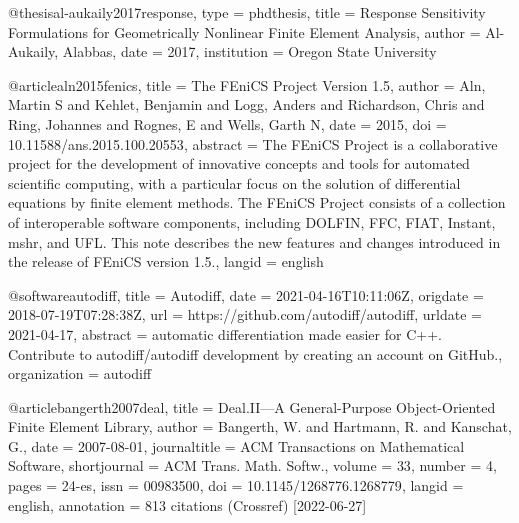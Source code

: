 @thesis{al-aukaily2017response,
  type = {phdthesis},
  title = {Response {{Sensitivity Formulations}} for {{Geometrically Nonlinear Finite}}  {{Element Analysis}}},
  author = {Al-Aukaily, Alabbas},
  date = {2017},
  institution = {Oregon State University}
}

@article{aln2015fenics,
  title = {The {{FEniCS Project Version}} 1.5},
  author = {Aln, Martin S and Kehlet, Benjamin and Logg, Anders and Richardson, Chris and Ring, Johannes and Rognes, E and Wells, Garth N},
  date = {2015},
  doi = {10.11588/ans.2015.100.20553},
  abstract = {The FEniCS Project is a collaborative project for the development of innovative concepts and tools for automated scientific computing, with a particular focus on the solution of differential equations by finite element methods. The FEniCS Project consists of a collection of interoperable software components, including DOLFIN, FFC, FIAT, Instant, mshr, and UFL. This note describes the new features and changes introduced in the release of FEniCS version 1.5.},
  langid = {english}
}

@software{autodiff,
  title = {Autodiff},
  date = {2021-04-16T10:11:06Z},
  origdate = {2018-07-19T07:28:38Z},
  url = {https://github.com/autodiff/autodiff},
  urldate = {2021-04-17},
  abstract = {automatic differentiation made easier for C++. Contribute to autodiff/autodiff development by creating an account on GitHub.},
  organization = {autodiff}
}

@article{bangerth2007deal,
  title = {Deal.{{II---A}} General-Purpose Object-Oriented Finite Element Library},
  author = {Bangerth, W. and Hartmann, R. and Kanschat, G.},
  date = {2007-08-01},
  journaltitle = {ACM Transactions on Mathematical Software},
  shortjournal = {ACM Trans. Math. Softw.},
  volume = {33},
  number = {4},
  pages = {24-es},
  issn = {00983500},
  doi = {10.1145/1268776.1268779},
  langid = {english},
  annotation = {813 citations (Crossref) [2022-06-27]}
}


